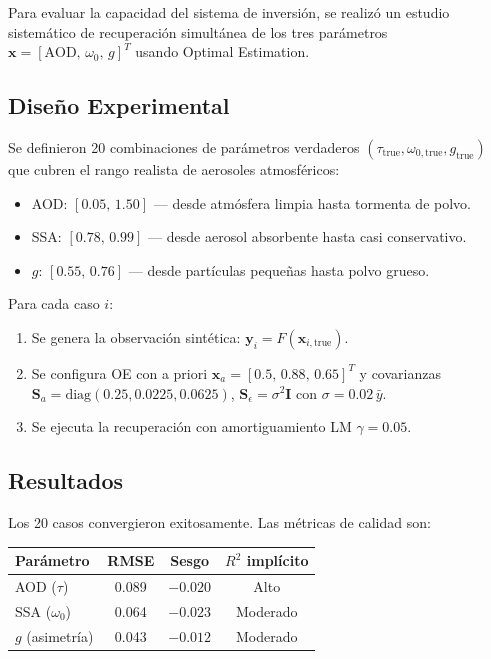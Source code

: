 \documentclass[a4paper,11pt]{article}
\begin{document}
Para evaluar la capacidad del sistema de inversi\'on, se realiz\'o un estudio
sistem\'atico de recuperaci\'on simult\'anea de los tres par\'ametros
$\mathbf{x} = [\text{AOD},\,\omega_0,\,g]^T$ usando Optimal Estimation.

\subsection{Dise\~no Experimental}

Se definieron 20 combinaciones de par\'ametros verdaderos
$(\tau_{\text{true}}, \omega_{0,\text{true}}, g_{\text{true}})$ que cubren
el rango realista de aerosoles atmosf\'ericos:
\begin{itemize}
    \item AOD: $[0.05,\, 1.50]$ --- desde atm\'osfera limpia hasta tormenta de polvo.
    \item SSA: $[0.78,\, 0.99]$ --- desde aerosol absorbente hasta casi conservativo.
    \item $g$: $[0.55,\, 0.76]$ --- desde part\'iculas peque\~nas hasta polvo grueso.
\end{itemize}

Para cada caso $i$:
\begin{enumerate}
    \item Se genera la observaci\'on sint\'etica: $\mathbf{y}_i = F(\mathbf{x}_{i,\text{true}})$.
    \item Se configura OE con a priori $\mathbf{x}_a = [0.5,\, 0.88,\, 0.65]^T$
          y covarianzas $\mathbf{S}_a = \text{diag}(0.25, 0.0225, 0.0625)$,
          $\mathbf{S}_\epsilon = \sigma^2 \mathbf{I}$ con $\sigma = 0.02\,\bar{y}$.
    \item Se ejecuta la recuperaci\'on con amortiguamiento LM $\gamma = 0.05$.
\end{enumerate}

\subsection{Resultados}

Los 20 casos convergieron exitosamente. Las m\'etricas de calidad son:
\begin{center}
\begin{tabular}{@{}lccc@{}}
\toprule
\textbf{Par\'ametro} & \textbf{RMSE} & \textbf{Sesgo} & \textbf{$R^2$ impl\'icito}\\ \midrule
AOD ($\tau$) & 0.089 & $-0.020$ & Alto \\
SSA ($\omega_0$) & 0.064 & $-0.023$ & Moderado \\
$g$ (asimetr\'ia) & 0.043 & $-0.012$ & Moderado \\
\bottomrule
\end{tabular}
\end{center}
\end{document}
